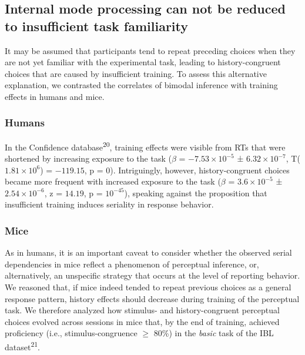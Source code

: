 \documentclass[
]{article}
\begin{document}
\hypertarget{internal-mode-processing-can-not-be-reduced-to-insufficient-task-familiarity}{%
\subsection{Internal mode processing can not be reduced to insufficient
task
familiarity}\label{internal-mode-processing-can-not-be-reduced-to-insufficient-task-familiarity}}

It may be assumed that participants tend to repeat preceding choices
when they are not yet familiar with the experimental task, leading to
history-congruent choices that are caused by insufficient training. To
assess this alternative explanation, we contrasted the correlates of
bimodal inference with training effects in humans and mice.

\hypertarget{humans-1}{%
\subsubsection{Humans}\label{humans-1}}

In the Confidence database\textsuperscript{20}, training effects were
visible from RTs that were shortened by increasing exposure to the task
(\(\beta\) = \(\ensuremath{-7.53\times 10^{-5}}\) ±
\(\ensuremath{6.32\times 10^{-7}}\),
T(\(\ensuremath{1.81\times 10^{6}}\)) = \(-119.15\), p = \(0\)).
Intriguingly, however, history-congruent choices became more frequent
with increased exposure to the task (\(\beta\) =
\(\ensuremath{3.6\times 10^{-5}}\) ±
\(\ensuremath{2.54\times 10^{-6}}\), z = \(14.19\), p =
\(\ensuremath{10^{-45}}\)), speaking against the proposition that
insufficient training induces seriality in response behavior.

\hypertarget{mice-1}{%
\subsubsection{Mice}\label{mice-1}}

As in humans, it is an important caveat to consider whether the observed
serial dependencies in mice reflect a phenomenon of perceptual
inference, or, alternatively, an unspecific strategy that occurs at the
level of reporting behavior. We reasoned that, if mice indeed tended to
repeat previous choices as a general response pattern, history effects
should decrease during training of the perceptual task. We therefore
analyzed how stimulus- and history-congruent perceptual choices evolved
across sessions in mice that, by the end of training, achieved
proficiency (i.e., stimulus-congruence \(\geq\) 80\%) in the
\emph{basic} task of the IBL dataset\textsuperscript{21}.
\end{document}
